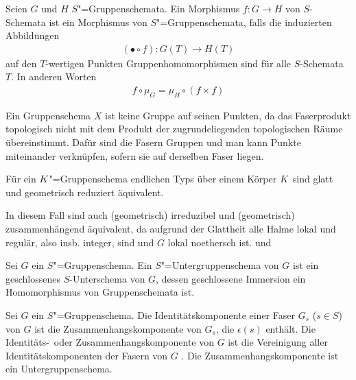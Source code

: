 \documentclass[german]{scrreprt}
\begin{document}
\begin{Definition}[$S$"=Gruppenschema]
\begin{Definition}
  Seien $G$ und $H$ $S$"=Gruppenschemata.
  Ein Morphismus $f\colon G\to H$ von $S$-Schemata ist ein Morphismus
  von $S$"=Gruppenschemata, falls die induzierten Abbildungen
  \begin{gather*}
  (\bullet\circ f)\colon G(T)\to H(T)
  \end{gather*}auf den $T$-wertigen Punkten
  Gruppenhomomorphismen sind für alle $S$-Schemata $T$.
  In anderen Worten
  \begin{gather*}
    f\circ\mu_G = \mu_H\circ(f\times f)
  \end{gather*}
  \cite[Definition 4.42]{wedhorn}
\end{Definition}

\begin{Bemerkung}
  Ein Gruppenschema $X$ ist keine Gruppe auf seinen Punkten, da das
  Faserprodukt topologisch nicht mit dem Produkt der zugrundeliegenden
  topologischen Räume übereinstimmt.
  Dafür sind die Fasern Gruppen und man kann Punkte miteinander
  verknüpfen, sofern sie auf derselben Faser liegen.
\end{Bemerkung}

\begin{Bemerkung}\label{gruppenschemaaequivalenzen}
  Für ein $K$"=Gruppenschema endlichen Typs über einem Körper $K$
  sind glatt und geometrisch reduziert äquivalent.
  \cite[8.5, Excercise 11]{bosch}
  
  In diesem Fall sind auch (geometrisch) irreduzibel und (geometrisch)
  zusammenhängend äquivalent, da aufgrund der Glattheit alle Halme
  lokal und regulär, also insb. integer, sind und $G$ lokal noethersch
  ist.
  \cite[s.][Exercise 3.16]{wedhorn} und \cite[Corollary 16.51]{wedhorn}
\end{Bemerkung}
\end{Definition}

\begin{Definition}[Untergruppenschema]
  Sei $G$ ein $S$"=Gruppenschema.
  Ein $S$"=Untergruppenschema von $G$ ist ein geschlossenes
  $S$-Unterschema von $G$, dessen geschlossene Immersion ein
  Homomorphismus von Gruppenschemata ist.
  \cite[vgl.][Definition 4.45]{wedhorn}
\end{Definition}

\begin{Definition}[Identitätskomponente]
  Sei $G$ ein $S$"=Gruppenschema.
  Die Identitätskomponente einer Faser $G_s$ ($s\in S$) von $G$ ist
  die Zusammenhangskomponente von $G_s$, die $\epsilon(s)$ enthält.
  Die Identitäts-~oder Zusammenhangskomponente von $G$ ist
  die Vereinigung aller Identitätskomponenten der Fasern von $G$
  \cite[Remark IV.6.1.2]{silverman2}.
  Die Zusammenhangskomponente ist ein Untergruppenschema.
\end{Definition}
\end{document}
